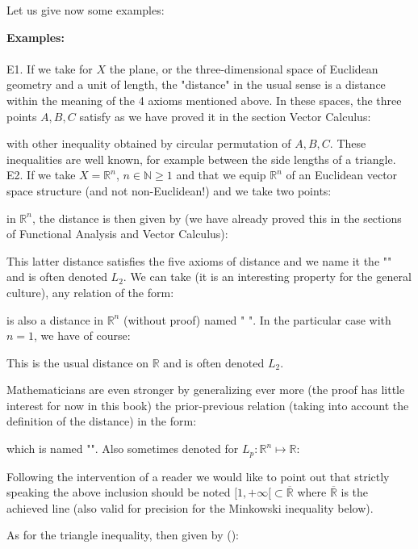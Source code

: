 	\pagebreak
	Let us give now some examples:
	\begin{tcolorbox}[colframe=black,colback=white,sharp corners]
	\textbf{{\Large {}}Examples:}\\\\
	E1. If we take for $X$ the plane, or the three-dimensional space of Euclidean geometry and a unit of length, the "distance" in the usual sense is a distance within the meaning of the 4 axioms mentioned above. In these spaces, the three points $A, B, C$ satisfy as we have proved it in the section Vector Calculus:
	
	with other inequality obtained by circular permutation of $A, B, C$. These inequalities are well known, for example between the side lengths of a triangle.\\
	
	E2. If we take $X=\mathbb{R}^n$, $n \in \mathbb{N} \geq 1$ and that we equip $\mathbb{R}^n$ of an Euclidean vector space structure (and not non-Euclidean!) and we take two points:
	
	in $\mathbb{R}^n$, the distance is then given by (we have already proved this in the sections of Functional Analysis and Vector Calculus):
	
	\end{tcolorbox}
	\label{euclidean topology}This latter distance satisfies the five axioms of distance and we name it the "" and is often denoted $L_2$. We can take (it is an interesting property for the general culture), any relation of the form:
	
	is also a distance in $\mathbb{R}^n$ (without proof) named " ". In the particular case with $n=1$, we have of course:
	
	This is the usual distance on $\mathbb{R}$ and is often denoted $L_2$.
	
	Mathematicians are even stronger by generalizing ever more (the proof has little interest for now in this book) the prior-previous relation (taking into account the definition of the distance) in the form:
	
	which is named "". Also sometimes denoted for $L_p:\mathbb{R}^n\mapsto\mathbb{R}$:
	
	\begin{tcolorbox}[title=Remark,colframe=black,arc=10pt]
	Following the intervention of a reader we would like to point out that strictly speaking the above inclusion should be noted $[1,+\infty[ \subset \mathbb{\overline{R}}$ where $\mathbb{\overline{R}}$ is the achieved line (also valid for precision for the Minkowski inequality below).
	\end{tcolorbox}	
	As for the triangle inequality, then given by ():
	

